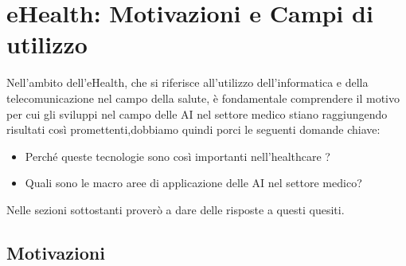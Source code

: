 \section{eHealth: Motivazioni e Campi di utilizzo}
Nell'ambito dell'eHealth, che si riferisce all'utilizzo dell'informatica e della telecomunicazione nel campo della salute,
è fondamentale comprendere il motivo per cui gli sviluppi nel campo delle AI nel settore medico stiano raggiungendo risultati così promettenti,dobbiamo quindi porci le  seguenti domande chiave: 
\begin{itemize}
    \item Perché queste tecnologie sono così importanti nell'healthcare ?
    \item Quali sono le macro aree di applicazione delle AI nel settore medico?
\end{itemize}  
Nelle sezioni sottostanti proverò a dare delle risposte a questi quesiti.


\subsection{Motivazioni}

